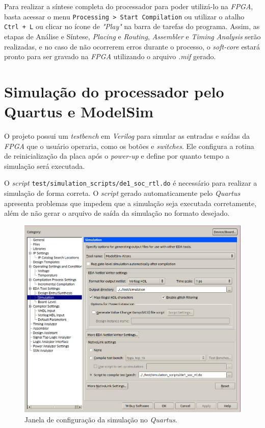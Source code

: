     { Para realizar a síntese completa do processador para poder utilizá-lo
        na \textit{FPGA}, basta acessar o menu \texttt{Processing > Start Compilation}
        ou utilizar o atalho \texttt{Ctrl + L} ou clicar no ícone de \textit{"Play"}
        na barra de tarefas do programa. Assim, as etapas de Análise e Síntese,
        \textit{Placing} e \textit{Routing}, \textit{Assembler} e
        \textit{Timing Analysis} serão realizadas, e no caso de não ocorrerem
        erros durante o processo, o \textit{soft-core} estará pronto para ser
        gravado na \textit{FPGA} utilizando o arquivo \textit{.mif} gerado.
    }


    \section{Simulação do processador pelo Quartus e ModelSim}
    { O projeto possui um \textit{testbench} em \textit{Verilog} para simular as
        entradas e saídas da \textit{FPGA} que o usuário operaria, como os botões
        e \textit{switches}. Ele configura a rotina de reinicialização da placa
        após o \textit{power-up} e define por quanto tempo a simulação será
        executada.
    }

    { O \textit{script} \texttt{test/simulation\_scripts/de1\_soc\_rtl.do} é
        necessário para realizar a simulação de forma correta. O \textit{script}
        gerado automaticamente pelo \textit{Quartus} apresenta problemas que
        impedem que a simulação seja executada corretamente, além de não gerar
        o arquivo de saída da simulação no formato desejado.
    }
    \begin{figure}[H]
    \centering
        \includegraphics[width=.6\linewidth]{../images/quartus/simulation_config.png}
        \caption{Janela de configuração da simulação no \textit{Quartus}.}
        \label{fig:quartus_simulation_config}
    \end{figure}

